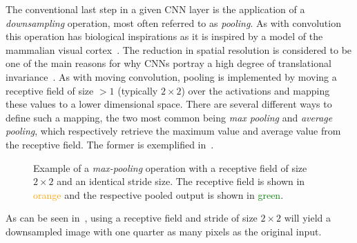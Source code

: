 The conventional last step in a given CNN layer is the application of a \textit{downsampling} operation, most often referred to as \textit{pooling}.
As with convolution this operation has biological inspirations as it is inspired by a model of the mammalian visual cortex~\cite[p.~966]{visint-cnn}.
The reduction in spatial resolution is considered to be one of the main reasons for why CNNs portray a high degree of translational invariance~\cite{cnn-translational-invariance}.
As with moving convolution, pooling is implemented by moving a receptive field of size $>1$ (typically $2 \times 2$) over the activations and mapping these values to a lower dimensional space.
There are several different ways to define such a mapping, the two most common being \textit{max pooling} and \textit{average pooling}, which respectively retrieve the maximum value and average value from the receptive field.
The former is exemplified in~.

\begin{figure}[htb]
  
  \caption{%
    Example of a \textit{max-pooling} operation with a receptive field of size $2 \times 2$ and an identical stride size.
    The receptive field is shown in \textcolor{orange}{orange} and the respective pooled output is shown in \textcolor{green}{green}.
  }%
  \label{fig:max-pooling}
\end{figure}

As can be seen in~, using a receptive field and stride of size $2 \times 2$ will yield a downsampled image with one quarter as many pixels as the original input.

